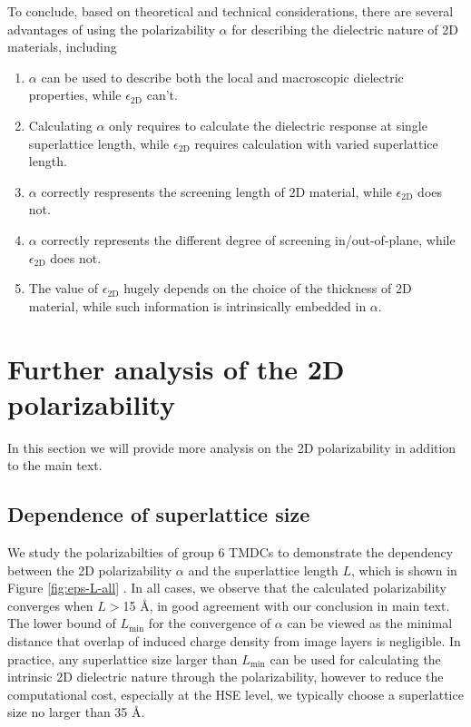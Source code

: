 \documentclass[manuscript=suppinfo,email=true,hyperref=true,keywords=false]{achemso}
\begin{document}
To conclude, based on theoretical and technical considerations, there are several
advantages of using the polarizability $\alpha$ for describing the dielectric
nature of 2D materials, including
\begin{enumerate}
\item $\alpha$ can be used to describe both the local and macroscopic dielectric properties, while $\epsilon_{\mathrm{2D}}$ can't.
\item Calculating $\alpha$ only requires to calculate the dielectric response at single superlattice length, while $\epsilon_{\mathrm{2D}}$ requires calculation with varied superlattice length.
\item $\alpha$ correctly respresents the screening length of 2D material, while $\epsilon_{\mathrm{2D}}$ does not.
\item $\alpha$ correctly represents the different degree of screening in/out-of-plane, while $\epsilon_{\mathrm{2D}}$ does not.
  
\item The value of $\epsilon_{\mathrm{2D}}$ hugely depends on the
  choice of the thickness of 2D material, while such information is
  intrinsically embedded in $\alpha$.
\end{enumerate}





\section{Further analysis of the 2D polarizability}
\label{sec:pol-2D}

In this section we will provide more analysis on the 2D polarizability
in addition to the main text.

\subsection{Dependence of superlattice size}
\label{sec:pol-2D-1}

We study the polarizabilties of group 6 TMDCs to demonstrate the
dependency between the 2D polarizability $\alpha$ and the superlattice
length $L$, which is shown in Figure \ref{fig:eps-L-all} .  In all cases, we observe that the calculated
polarizability converges when $L>$15 \AA{}, in good agreement with our
conclusion in main text. The lower bound of $L_{\mathrm{min}}$ for the
convergence of $\alpha$ can be viewed as the minimal distance that
overlap of induced charge density from image layers is negligible. In
practice, any superlattice size larger than $L_{\mathrm{min}}$ can be
used for calculating the intrinsic 2D dielectric nature through the
polarizability, however to reduce the computational cost, especially
at the HSE level, we typically choose a superlattice size no larger
than 35 \AA{}.
\end{document}

